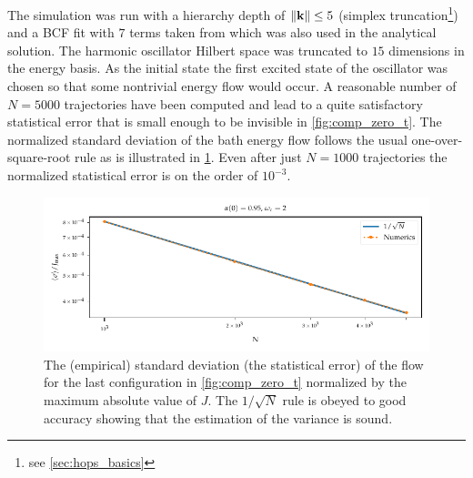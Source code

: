The simulation was run with a hierarchy depth of
\(\norm{\vb{k}} \leq 5\) (simplex truncation\footnote{see
  \cref{sec:hops_basics}}) and a BCF fit with \(7\) terms taken from
\cite{RichardDiss} which was also used in the analytical solution. The
harmonic oscillator Hilbert space was truncated to \(15\) dimensions
in the energy basis. As the initial state the first excited state of
the oscillator was chosen so that some nontrivial energy flow would
occur. A reasonable number of \(N=5000\) trajectories have been
computed and lead to a quite satisfactory statistical error that is
small enough to be invisible in \cref{fig:comp_zero_t}. The normalized
standard deviation of the bath energy flow follows the usual
one-over-square-root rule as is illustrated in
\cref{fig:sqrt_conv}. Even after just \(N=1000\) trajectories the
normalized statistical error is on the order of \(10^{-3}\).
\begin{figure}[htp]
  \centering
  \includegraphics{figs/analytic_comp/sqrt_convergence.pdf}
  \caption{\label{fig:sqrt_conv} The (empirical) standard deviation
    (the statistical error) of the flow for the last configuration in
    \cref{fig:comp_zero_t} normalized by the maximum absolute value of
    \(J\). The \(1/\sqrt{N}\) rule is obeyed to good accuracy showing
    that the estimation of the variance is sound.}
\end{figure}
